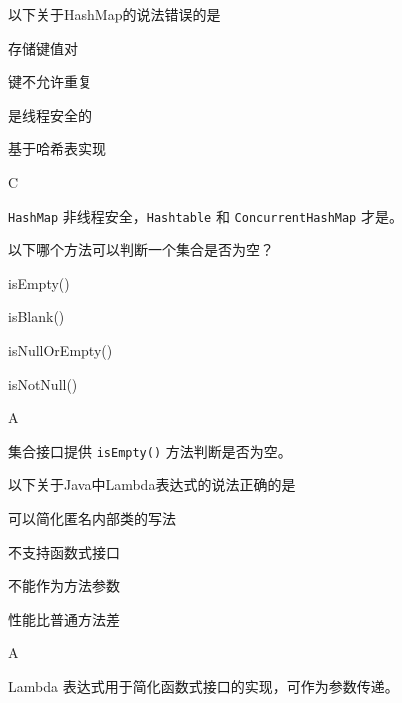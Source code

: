 \begin{question}
	以下关于HashMap的说法错误的是
	\begin{options}
		\item 存储键值对
		\item 键不允许重复
		\item 是线程安全的
		\item 基于哈希表实现
	\end{options}
	\begin{answer}
		C
	\end{answer}
	\begin{explanation}
		\texttt{HashMap} 非线程安全，\texttt{Hashtable} 和 \texttt{ConcurrentHashMap} 才是。
	\end{explanation}
\end{question}

\begin{question}
	以下哪个方法可以判断一个集合是否为空？
	\begin{options}
		\item isEmpty()
		\item isBlank()
		\item isNullOrEmpty()
		\item isNotNull()
	\end{options}
	\begin{answer}
		A
	\end{answer}
	\begin{explanation}
		集合接口提供 \texttt{isEmpty()} 方法判断是否为空。
	\end{explanation}
\end{question}

\begin{question}
	以下关于Java中Lambda表达式的说法正确的是
	\begin{options}
		\item 可以简化匿名内部类的写法
		\item 不支持函数式接口
		\item 不能作为方法参数
		\item 性能比普通方法差
	\end{options}
	\begin{answer}
		A
	\end{answer}
	\begin{explanation}
		Lambda 表达式用于简化函数式接口的实现，可作为参数传递。
	\end{explanation}
\end{question}

